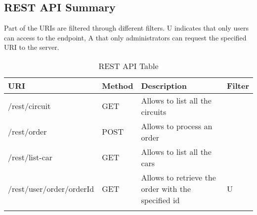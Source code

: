 \subsection{REST API Summary}

Part of the URIs are filtered through different filters. U indicates that only users can access to the endpoint,
A that only administrators can request the specified URI to the server.

\begin{longtable}{|p{}|p{} |p{}|p{}|}
\hline
\textbf{URI} & \textbf{Method} & \textbf{Description} & \textbf{Filter} \\ \hline
/rest/circuit & GET & Allows to list all the circuits & \\ \hline
/rest/order & POST & Allows to process an order & \\ \hline
/rest/list-car & GET & Allows to list all the cars & \\ \hline
/rest/user/order/{orderId} & GET & Allows to retrieve the order with the specified id & U \\ \hline

\caption{REST API Table}
\label{tab:termGlossary}
\end{longtable}